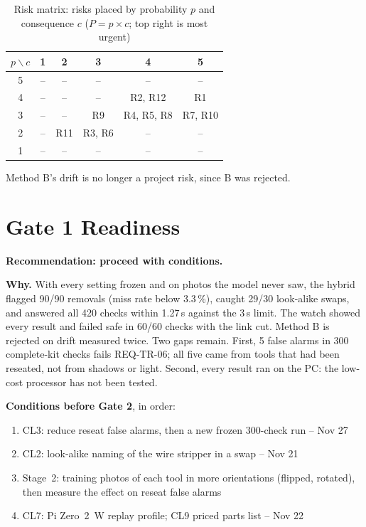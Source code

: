 \begin{table}[!t]
\centering
\footnotesize
\caption{Risk matrix: risks placed by probability $p$ and consequence $c$ ($P = p \times c$; top right is most urgent)}
\label{tab:matrix}
\begin{tabular}{@{}c|ccccc@{}}
$p \backslash c$ & 1 & 2 & 3 & 4 & 5 \\
\hline
5 & -- & -- & -- & -- & -- \\
4 & -- & -- & -- & R2, R12 & R1 \\
3 & -- & -- & R9 & R4, R5, R8 & R7, R10 \\
2 & -- & R11 & R3, R6 & -- & -- \\
1 & -- & -- & -- & -- & -- \\
\end{tabular}
\end{table}

Method B's drift is no longer a project risk, since B was rejected.

\section{Gate 1 Readiness}
\textbf{Recommendation: proceed with conditions.}

\textbf{Why.} With every setting frozen and on photos the model never
saw, the hybrid flagged 90/90 removals (miss rate below 3.3\,\%), caught
29/30 look-alike swaps, and answered all 420 checks within 1.27\,s against
the 3\,s limit. The watch showed every result and failed safe in 60/60
checks with the link cut. Method B is rejected on drift measured twice.
Two gaps remain. First, 5 false alarms in 300 complete-kit checks fails
REQ-TR-06; all five came from tools that had been reseated, not from
shadows or light. Second, every result ran on the PC: the low-cost
processor has not been tested.

\textbf{Conditions before Gate 2}, in order:
\begin{enumerate}
\item CL3: reduce reseat false alarms, then a new frozen 300-check run --
Nov 27
\item CL2: look-alike naming of the wire stripper in a swap -- Nov 21
\item Stage~2: training photos of each tool in more orientations (flipped,
rotated), then measure the effect on reseat false alarms
\item CL7: Pi Zero~2~W replay profile; CL9 priced parts list -- Nov 22
\end{enumerate}

